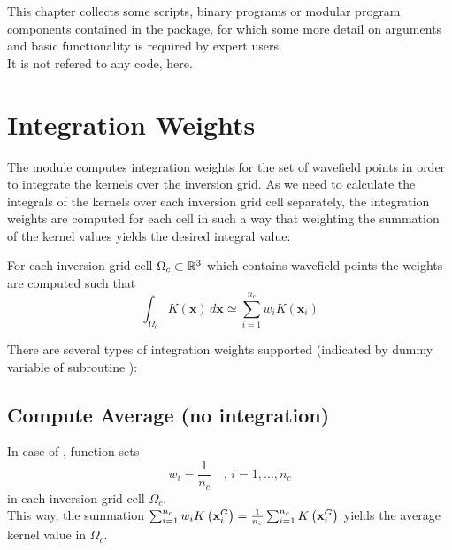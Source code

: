 %
%
%
This chapter collects some scripts, binary programs or modular program components contained 
in the \ASKI package, for which some more detail on arguments and basic functionality is 
required by expert users.\\ 
It is not refered to any code, here.
%
\section{Integration Weights} \label{programs_scripts,sec:fmod_intw}
%
The \ASKI module  computes integration weights for the set of wavefield points 
in order to integrate the kernels over the inversion grid. As we need to calculate the integrals of the 
kernels over each inversion grid cell separately, the integration weights are computed for each cell in 
such a way that weighting the summation of the kernel values yields the desired integral value:

For each inversion grid cell $\Omega_c \subset \mathbb{R}^3$ which contains wavefield points \wpG the weights 
\weights are computed such that
\begin{equation} \label{programs_scripts,sec:fmod_intw,eq:integration_global}
\int_{\Omega_c} K(\mathbf{x})\,d\mathbf{x} \simeq \sum_{i=1}^{n_c} w_iK(\mathbf{x}_i)
\end{equation}

There are several types of integration weights supported (indicated by dummy variable  of 
subroutine ):
%
\setcounter{subsection}{-1}
\subsection{Compute Average (no integration)} \label{programs_scripts,sec:fmod_intw,sub:average}
%
In case of , function  sets 
\[w_i = \frac{1}{n_c} \quad ,\, i=1,\dots,n_c\]
in each inversion grid cell $\Omega_c$.\\
This way, the summation $\sum_{i=1}^{n_c} w_iK\left( \mathbf{x}_i^G \right) = \frac{1}{n_c} \sum_{i=1}^{n_c} 
K\left( \mathbf{x}_i^G \right)$ yields the average kernel value in $\Omega_c$.


